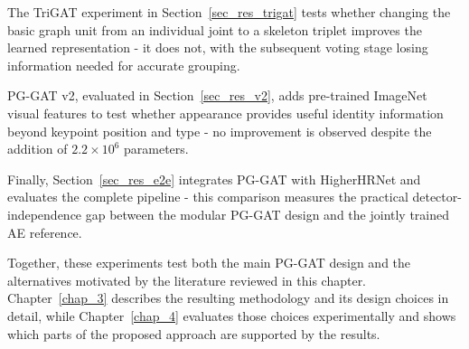 \begin{compactitem}
    \item The TriGAT experiment in Section~\ref{sec_res_trigat} tests
    whether changing the basic graph unit from an individual joint to a
    skeleton triplet improves the learned representation - it does not,
    with the subsequent voting stage losing information needed for
    accurate grouping.

    \item PG-GAT v2, evaluated in Section~\ref{sec_res_v2}, adds
    pre-trained ImageNet visual features to test whether appearance
    provides useful identity information beyond keypoint position and
    type - no improvement is observed despite the addition of
    $2.2 \times 10^{6}$ parameters.

    \item Finally, Section~\ref{sec_res_e2e} integrates PG-GAT with
    HigherHRNet and evaluates the complete pipeline - this comparison
    measures the practical detector-independence gap between the
    modular PG-GAT design and the jointly trained AE reference.
\end{compactitem}

Together, these experiments test both the main PG-GAT design and the
alternatives motivated by the literature reviewed in this chapter.
Chapter~\ref{chap_3} describes the resulting methodology and its design
choices in detail, while Chapter~\ref{chap_4} evaluates those choices
experimentally and shows which parts of the proposed approach are
supported by the results.